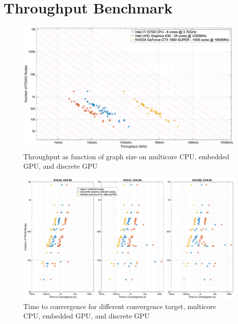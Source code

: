 \section{Throughput Benchmark}
\begin{figure}[p]
    \centering
    \includegraphics[width=1\textwidth]{figs/aralia/slides_nodes_vs_throughput.eps}
    \caption{Throughput as function of graph size on multicore CPU, embedded GPU, and discrete GPU}
    \label{fig:nodes_vs_throughput}
\end{figure}

\begin{figure}[p]
    \centering
    \includegraphics[width=1\textwidth]{figs/aralia/slides_nodes_vs_convergence.eps}
    \caption{Time to convergence for different convergence target, multicore CPU, embedded GPU, and discrete GPU}
    \label{fig:nodes_vs_convergence}
\end{figure}